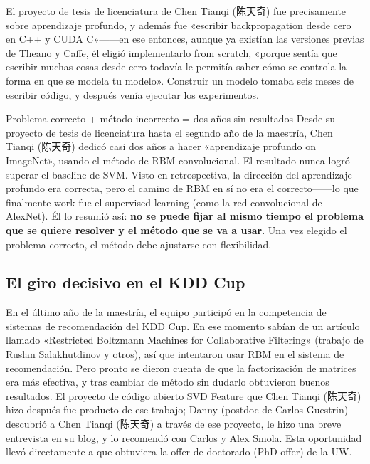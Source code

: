 \documentclass[a4paper]{article}
\begin{document}
El proyecto de tesis de licenciatura de Chen Tianqi (陈天奇) fue precisamente sobre aprendizaje profundo, y además fue «escribir backpropagation desde cero en C++ y CUDA C»------en ese entonces, aunque ya existían las versiones previas de Theano y Caffe, él eligió implementarlo from scratch, «porque sentía que escribir muchas cosas desde cero todavía le permitía saber cómo se controla la forma en que se modela tu modelo». Construir un modelo tomaba seis meses de escribir código, y después venía ejecutar los experimentos.

\begin{warningbox}{Problema correcto + método incorrecto = dos años sin resultados}
Desde su proyecto de tesis de licenciatura hasta el segundo año de la maestría, Chen Tianqi (陈天奇) dedicó casi dos años a hacer «aprendizaje profundo on ImageNet», usando el método de RBM convolucional. El resultado nunca logró superar el baseline de SVM. Visto en retrospectiva, la dirección del aprendizaje profundo era correcta, pero el camino de RBM en sí no era el correcto------lo que finalmente work fue el supervised learning (como la red convolucional de AlexNet). Él lo resumió así: \textbf{no se puede fijar al mismo tiempo el problema que se quiere resolver y el método que se va a usar}. Una vez elegido el problema correcto, el método debe ajustarse con flexibilidad.
\end{warningbox}

\subsection{El giro decisivo en el KDD Cup}

En el último año de la maestría, el equipo participó en la competencia de sistemas de recomendación del KDD Cup. En ese momento sabían de un artículo llamado «Restricted Boltzmann Machines for Collaborative Filtering» (trabajo de Ruslan Salakhutdinov y otros), así que intentaron usar RBM en el sistema de recomendación. Pero pronto se dieron cuenta de que la factorización de matrices era más efectiva, y tras cambiar de método sin dudarlo obtuvieron buenos resultados. El proyecto de código abierto SVD Feature que Chen Tianqi (陈天奇) hizo después fue producto de ese trabajo; Danny (postdoc de Carlos Guestrin) descubrió a Chen Tianqi (陈天奇) a través de ese proyecto, le hizo una breve entrevista en su blog, y lo recomendó con Carlos y Alex Smola. Esta oportunidad llevó directamente a que obtuviera la offer de doctorado (PhD offer) de la UW.
\end{document}
